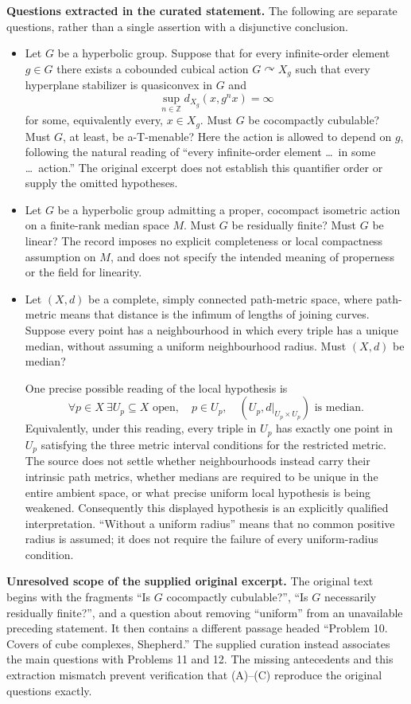 \documentclass[11pt]{article}
\newcommand{\Z}{\mathbb{Z}}
\begin{document}
\textbf{Questions extracted in the curated statement.} The following are separate questions, rather than a single assertion with a disjunctive conclusion.
\begin{itemize}
\item[(A)] Let $G$ be a hyperbolic group. Suppose that for every infinite-order element $g\in G$ there exists a cobounded cubical action $G\curvearrowright X_g$ such that every hyperplane stabilizer is quasiconvex in $G$ and
\[
 \sup_{n\in\Z}d_{X_g}(x,g^n x)=\infty
\]
for some, equivalently every, $x\in X_g$. Must $G$ be cocompactly cubulable? Must $G$, at least, be a-T-menable? Here the action is allowed to depend on $g$, following the natural reading of ``every infinite-order element \ldots\ in some \ldots\ action.'' The original excerpt does not establish this quantifier order or supply the omitted hypotheses.
\item[(B)] Let $G$ be a hyperbolic group admitting a proper, cocompact isometric action on a finite-rank median space $M$. Must $G$ be residually finite? Must $G$ be linear? The record imposes no explicit completeness or local compactness assumption on $M$, and does not specify the intended meaning of properness or the field for linearity.
\item[(C)] Let $(X,d)$ be a complete, simply connected path-metric space, where path-metric means that distance is the infimum of lengths of joining curves. Suppose every point has a neighbourhood in which every triple has a unique median, without assuming a uniform neighbourhood radius. Must $(X,d)$ be median?

One precise possible reading of the local hypothesis is
\[
 \forall p\in X\ \exists U_p\subseteq X\text{ open},\quad p\in U_p,\quad (U_p,d|_{U_p\times U_p})\text{ is median}.
\]
Equivalently, under this reading, every triple in $U_p$ has exactly one point in $U_p$ satisfying the three metric interval conditions for the restricted metric. The source does not settle whether neighbourhoods instead carry their intrinsic path metrics, whether medians are required to be unique in the entire ambient space, or what precise uniform local hypothesis is being weakened. Consequently this displayed hypothesis is an explicitly qualified interpretation. ``Without a uniform radius'' means that no common positive radius is assumed; it does not require the failure of every uniform-radius condition.
\end{itemize}

\textbf{Unresolved scope of the supplied original excerpt.} The original text begins with the fragments ``Is $G$ cocompactly cubulable?'', ``Is $G$ necessarily residually finite?'', and a question about removing ``uniform'' from an unavailable preceding statement. It then contains a different passage headed ``Problem 10. Covers of cube complexes, Shepherd.'' The supplied curation instead associates the main questions with Problems 11 and 12. The missing antecedents and this extraction mismatch prevent verification that (A)--(C) reproduce the original questions exactly.
\end{document}
